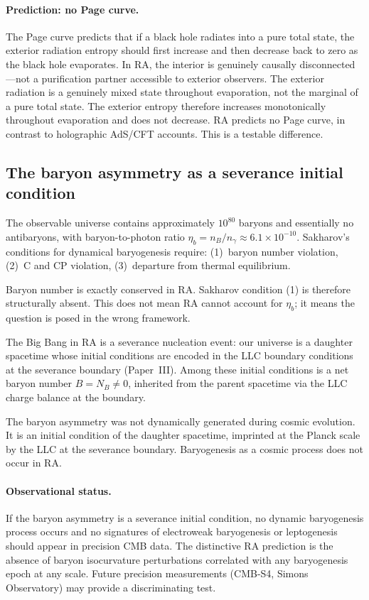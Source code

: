 \documentclass[11pt]{article}
\begin{document}
\paragraph{Prediction: no Page curve.} The Page curve predicts that if a black hole radiates into a pure total state, the exterior radiation entropy should first increase and then decrease back to zero as the black hole evaporates. In RA, the interior is genuinely causally disconnected---not a purification partner accessible to exterior observers. The exterior radiation is a genuinely mixed state throughout evaporation, not the marginal of a pure total state. The exterior entropy therefore increases monotonically throughout evaporation and does not decrease. RA predicts no Page curve, in contrast to holographic AdS/CFT accounts. This is a testable difference.

\subsection{The baryon asymmetry as a severance initial condition}

The observable universe contains approximately $10^{80}$ baryons and essentially no antibaryons, with baryon-to-photon ratio $\eta_b=n_B/n_\gamma\approx 6.1\times 10^{-10}$. Sakharov's conditions for dynamical baryogenesis require: (1)~baryon number violation, (2)~C and CP violation, (3)~departure from thermal equilibrium.

Baryon number is exactly conserved in RA. Sakharov condition (1) is therefore structurally absent. This does not mean RA cannot account for $\eta_b$; it means the question is posed in the wrong framework.

The Big Bang in RA is a severance nucleation event: our universe is a daughter spacetime whose initial conditions are encoded in the LLC boundary conditions at the severance boundary (Paper~III). Among these initial conditions is a net baryon number $B=N_B\ne 0$, inherited from the parent spacetime via the LLC charge balance at the boundary.

The baryon asymmetry was not dynamically generated during cosmic evolution. It is an initial condition of the daughter spacetime, imprinted at the Planck scale by the LLC at the severance boundary. Baryogenesis as a cosmic process does not occur in RA.

\paragraph{Observational status.} If the baryon asymmetry is a severance initial condition, no dynamic baryogenesis process occurs and no signatures of electroweak baryogenesis or leptogenesis should appear in precision CMB data. The distinctive RA prediction is the absence of baryon isocurvature perturbations correlated with any baryogenesis epoch at any scale. Future precision measurements (CMB-S4, Simons Observatory) may provide a discriminating test.
\end{document}

